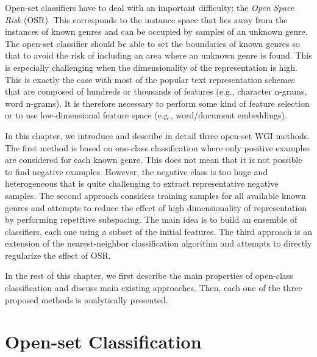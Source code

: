 Open-set classifiers have to deal with an important difficulty: the \textit{Open Space Risk} (OSR). This corresponds to the instance space that lies away from the instances of known genres and can be occupied by samples of an unknown genre. The open-set classifier should be able to set the boundaries of known genres so that to avoid the risk of including an area where an unknown genre is found. This is especially challenging when the dimensionality of the representation is high. This is exactly the case with most of the popular text representation schemes that are composed of hundreds or thousands of features (e.g., character n-grams, word n-grams). It is therefore necessary to perform some kind of feature selection or to use low-dimensional feature space (e.g., word/document embeddings). 

In this chapter, we introduce and describe in detail three open-set WGI methods. The first method is based on one-class classification where only positive examples are considered for each known genre. This does not mean that it is not possible to find negative examples. However, the negative class is too huge and heterogeneous that is quite challenging to extract representative negative samples. The second approach considers training samples for all available known genres and attempts to reduce the effect of high dimensionality of representation by performing repetitive subspacing. The main idea is to build an ensemble of classifiers, each one using a subset of the initial features. The third approach is an extension of the nearest-neighbor classification algorithm and attempts to directly regularize the effect of OSR.


In the rest of this chapter, we first describe the main properties of open-class classification and discuss main existing approaches. Then, each one of the three proposed methods is analytically presented. 

\section{Open-set Classification}

